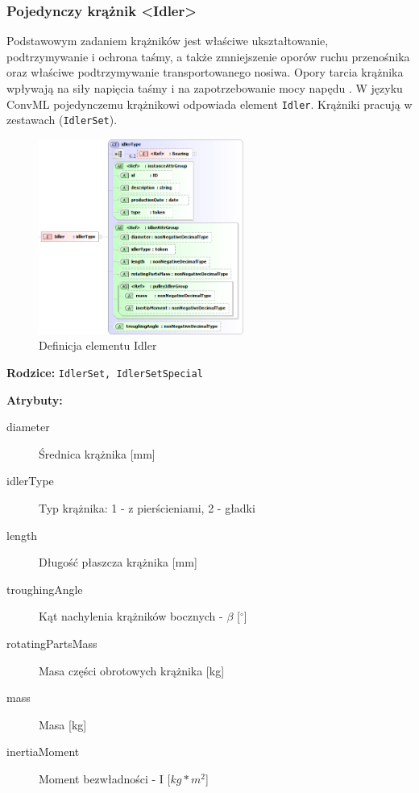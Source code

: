 \documentclass[12pt,a4paper]{article}
\begin{document}
\subsubsection{Pojedynczy krążnik <Idler>}
Podstawowym zadaniem krążników jest właściwe ukształtowanie, podtrzymywanie i
ochrona taśmy, a także zmniejszenie oporów ruchu przenośnika oraz właściwe
podtrzymywanie transportowanego nosiwa.  Opory tarcia krążnika wpływają na siły
napięcia taśmy i na zapotrzebowanie mocy napędu \cite{Antoniak2005}.  W języku
ConvML pojedynczemu krążnikowi odpowiada element {\tt Idler}. Krążniki pracują w
zestawach ({\tt IdlerSet}).

\begin{figure}[H]
  \centering
  \includegraphics[width=0.6\textwidth]{png/liquid/Idler}
  \caption{Definicja elementu Idler}
  \label{fig:idler-xsd}
\end{figure}

\noindent\textbf{Rodzice:} \texttt{IdlerSet, IdlerSetSpecial}

\noindent\textbf{Atrybuty:}
\begin{description}
\item[diameter] Średnica krążnika [mm]
\item[idlerType] Typ krążnika: 1 - z pierścieniami, 2 - gładki
\item[length] Długość płaszcza krążnika [mm]
\item[troughingAngle] Kąt nachylenia krążników bocznych - $\beta$ [$^\circ$]
\item[rotatingPartsMass] Masa części obrotowych krążnika [kg]
\item[mass] Masa [kg]
\item[inertiaMoment] Moment bezwładności - I [$kg*m^2$]
\end{description}
\end{document}
